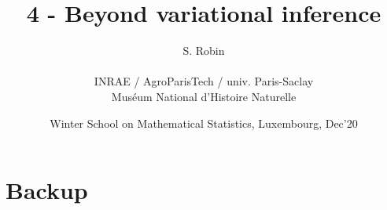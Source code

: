 \documentclass[8pt]{beamer}
\newcommand{\figlux}{./Figures}
\begin{document}
\title{4 - Beyond variational inference}

\author[S. Robin]{S. Robin \\ ~\\
  {\small INRAE / AgroParisTech / univ. Paris-Saclay \\
  Mus\'eum National d'Histoire Naturelle}
  }

\date[Luxembourg, Dec'20]{Winter School on Mathematical Statistics, Luxembourg, Dec'20}

\maketitle











\backupbegin 
\section*{Backup}



\backupend 

\end{document}
